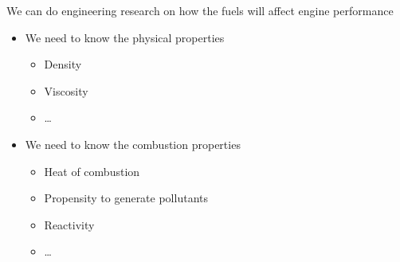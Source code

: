 \documentclass{beamer}
\begin{document}
\begin{frame}{We can do engineering research on how the fuels will affect engine performance}
    \begin{itemize}
        \item We need to know the physical properties
        \begin{itemize}
            \item Density
            \item Viscosity
            \item \ldots
        \end{itemize}
        \item We need to know the \alert<2->{combustion properties}
        \begin{itemize}
            \item Heat of combustion
            \item Propensity to generate pollutants
            \item Reactivity
            \item \ldots
        \end{itemize}
    \end{itemize}
\end{frame}
\end{document}

